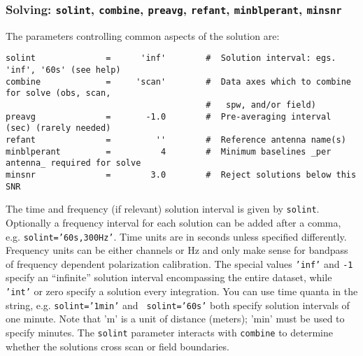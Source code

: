 \subsubsection{Solving: {\tt solint}, {\tt combine},
{\tt preavg}, {\tt refant}, {\tt minblperant}, {\tt minsnr} }
\label{section:cal.solve.pars.solving}

The parameters controlling common aspects of the solution are:
\small
\begin{verbatim}
solint              =      'inf'        #  Solution interval: egs. 'inf', '60s' (see help)
combine             =     'scan'        #  Data axes which to combine for solve (obs, scan, 
                                        #   spw, and/or field)
preavg              =       -1.0        #  Pre-averaging interval (sec) (rarely needed)
refant              =         ''        #  Reference antenna name(s)
minblperant         =          4        #  Minimum baselines _per antenna_ required for solve
minsnr              =        3.0        #  Reject solutions below this SNR
\end{verbatim} 
\normalsize

The time and frequency (if relevant) solution interval is given by {\tt solint}. Optionally a
frequency interval for each solution can be added after a comma,
e.g. {\tt solint='60s,300Hz'}. Time units are in seconds unless
specified differently. Frequency units can be either channels or Hz
and only make sense for bandpass of frequency dependent polarization
calibration.  The special values {\tt 'inf'} and {\tt -1} specify an
``infinite'' solution interval encompassing the entire dataset, while
{\tt 'int'} or zero specify a solution every integration. You can
use time quanta in the string, e.g. {\tt solint='1min'} and {\tt
  solint='60s'} both specify solution intervals of one minute.  Note
that 'm' is a unit of distance (meters); 'min' must be used to specify
minutes.  The {\tt solint} parameter interacts with {\tt combine} to
determine whether the solutions cross scan or field boundaries.

